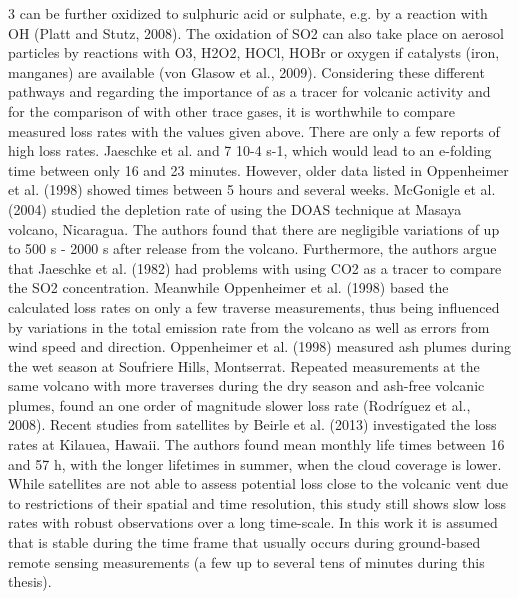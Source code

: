 \documentclass  [
  paper    = a4,
  BCOR     = 10mm,
  twoside,
  fontsize = 12pt,
  fleqn,
  toc      = bibnumbered,
  toc      = listofnumbered,
  numbers  = noendperiod,
  headings = normal,
  listof   = leveldown,
  version  = 3.03
]                                       {scrreprt}
\begin{document}
	3 can be further oxidized to sulphuric acid or sulphate, e.g. by a
	reaction with OH (Platt and Stutz, 2008). The oxidation of SO2 can also take
	place on aerosol particles by reactions with O3, H2O2, HOCl, HOBr or oxygen if
	catalysts (iron, manganes) are available (von Glasow et al., 2009).
	Considering these different pathways and regarding the importance of  as
	a tracer for volcanic activity and for the comparison of  with other trace
	gases, it is worthwhile to compare measured  loss rates with the values given
	above. There are only a few reports of high  loss rates. Jaeschke et al.
	and 7  10-4 s-1, which would lead to an e-folding time between only 16 and
	23 minutes. However, older data listed in Oppenheimer et al. (1998) showed
	times between 5 hours and several weeks. McGonigle et al. (2004) studied the
	depletion rate of  using the DOAS technique at Masaya volcano, Nicaragua.
	The authors found that there are negligible variations of up to 500 s - 2000 s
	after release from the volcano. Furthermore, the authors argue that Jaeschke
	et al. (1982) had problems with using CO2 as a tracer to compare the SO2
	concentration. Meanwhile Oppenheimer et al. (1998) based the calculated loss
	rates on only a few traverse measurements, thus being influenced by variations
	in the total emission rate from the volcano as well as errors from wind speed and
	direction. Oppenheimer et al. (1998) measured ash plumes during the wet season
	at Soufriere Hills, Montserrat. Repeated measurements at the same volcano with
	more traverses during the dry season and ash-free volcanic plumes, found an one
	order of magnitude slower  loss rate (Rodríguez et al., 2008). Recent studies
	from satellites by Beirle et al. (2013) investigated the  loss rates at Kilauea,
	Hawaii. The authors found mean monthly  life times between 16 and 57 h,
	with the longer lifetimes in summer, when the cloud coverage is lower. While
	satellites are not able to assess potential  loss close to the volcanic vent due
	to restrictions of their spatial and time resolution, this study still shows slow
	 loss rates with robust observations over a long time-scale.
	In this work it is assumed that  is stable during the time frame that usually
	occurs during ground-based remote sensing measurements (a few up to several
	tens of minutes during this thesis).
\end{document}
